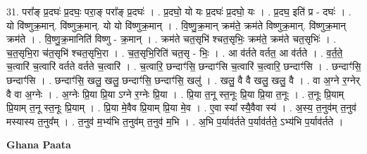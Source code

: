 \documentclass[17pt]{extarticle}
\begin{document}
31. परा᳚ङ् प्र॒दघः॑ प्र॒दघः॒ परा॒ङ् परा᳚ङ् प्र॒दघः॑ । . प्र॒दघो॒ यो यः प्र॒दघः॑ प्र॒दघो॒ यः । . प्र॒दघ॒ इति॑ प्र - दघः॑ । . यो वि॑ष्णुक्र॒मान्. वि॑ष्णुक्र॒मान्. यो यो वि॑ष्णुक्र॒मान् । . वि॒ष्णु॒क्र॒मान् क्रम॑ते॒ क्रम॑ते विष्णुक्र॒मान्. वि॑ष्णुक्र॒मान् क्रम॑ते । . वि॒ष्णु॒क्र॒मानिति॑ विष्णु - क्र॒मान् । . क्रम॑ते चत॒सृभि॑ श्चत॒सृभिः॒ क्रम॑ते॒ क्रम॑ते चत॒सृभिः॑ । . च॒त॒सृभि॒रा च॑त॒सृभि॑ श्चत॒सृभि॒रा । . च॒त॒सृभि॒रिति॑ चत॒सृ - भिः॒ । . आ व॑र्तते वर्तत॒ आ व॑र्तते । . व॒र्त॒ते॒ च॒त्वारि॑ च॒त्वारि॑ वर्तते वर्तते च॒त्वारि॑ । . च॒त्वारि॒ छन्दाꣳ॑सि॒ छन्दाꣳ॑सि च॒त्वारि॑ च॒त्वारि॒ छन्दाꣳ॑सि । . छन्दाꣳ॑सि॒ छन्दाꣳ॑सि । . छन्दाꣳ॑सि॒ खलु॒ खलु॒ छन्दाꣳ॑सि॒ छन्दाꣳ॑सि॒ खलु॑ । . खलु॒ वै वै खलु॒ खलु॒ वै । . वा अ॒ग्ने र॒ग्नेर् वै वा अ॒ग्नेः । . अ॒ग्नेः प्रि॒या प्रि॒या ऽग्ने र॒ग्नेः प्रि॒या । . प्रि॒या त॒नू स्त॒नूः प्रि॒या प्रि॒या त॒नूः । . त॒नूः प्रि॒याम् प्रि॒याम् त॒नू स्त॒नूः प्रि॒याम् । . प्रि॒या मे॒वैव प्रि॒याम् प्रि॒या मे॒व । . ए॒वा स्या᳚ स्यै॒वैवा स्य॑ । . अ॒स्य॒ त॒नुव॑म् त॒नुव॑ मस्यास्य त॒नुव᳚म् । . त॒नुव॑ म॒भ्य॑भि त॒नुव॑म् त॒नुव॑ म॒भि । . अ॒भि प॒र्याव॑र्तते प॒र्याव॑र्तते॒ ऽभ्य॑भि प॒र्याव॑र्तते । \newline

\textbf{Ghana Paata } \newline
\end{document}
